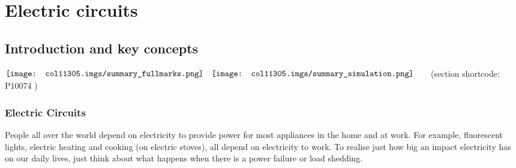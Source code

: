          \chapter{Electric circuits}
    \setcounter{figure}{1}
    \setcounter{subfigure}{1}
    \label{f13bac5321b85aca0e213ebdf4f72465}
         \section{ Introduction and key concepts}
    \nopagebreak
            \label{m38771} $ \hspace{-5pt}\begin{array}{cccccccccccc}   \texttt{[image: col11305.imgs/summary\_fullmarks.png]} &   \texttt{[image: col11305.imgs/summary\_simulation.png]} &   \end{array} $ \hspace{2 pt}\raisebox{-5 pt}{} {(section shortcode: P10074 )} \par 
    \label{m38771*cid2}
            \subsection{ Electric Circuits}
            \nopagebreak
      \label{m38771*id62184}People all over the world depend on electricity to provide power for most appliances in the home and at work. For example, fluorescent lights, electric heating and cooking (on electric stoves), all depend on electricity to work.
To realise just how big an impact electricity has on our daily lives, just think about what happens when there is a power
failure or load shedding.\par 
\label{m38771*secfhsst!!!underscore!!!id72}
